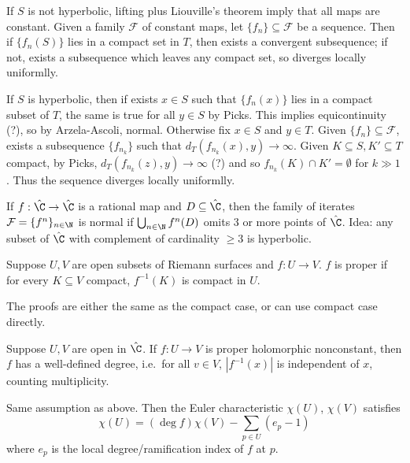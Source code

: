 \documentclass[a4paper]{article}
\begin{document}
\begin{remark}
  If \(S\) is not hyperbolic, lifting plus Liouville's theorem imply that all maps are constant. Given a family \(\mathcal F\) of constant maps, let \(\{f_n\} \subseteq \mathcal F\) be a sequence. Then if \(\{f_n(S)\}\) lies in a compact set in \(T\), then exists a convergent subsequence; if not, exists a subsequence which leaves any compact set, so diverges locally uniformlly.

  If \(S\) is hyperbolic, then if exists \(x \in S\) such that \(\{f_n(x)\}\) lies in a compact subset of \(T\), the same is true for all \(y \in S\) by Picks. This implies equicontinuity (?), so by Arzela-Ascoli, normal. Otherwise fix \(x \in S\) and \(y \in T\). Given \(\{f_n\} \subseteq \mathcal F\), exists a subsequence \(\{f_{n_k}\}\) such that \(d_T(f_{n_k}(x), y) \to \infty\). Given \(K \subseteq S, K' \subseteq T\) compact, by Picks, \(d_T(f_{n_k}(z), y) \to \infty\) (?) and so \(f_{n_k}(K) \cap K' = \emptyset\) for \(k \gg 1\). Thus the sequence diverges locally uniformlly.
\end{remark}

\begin{eg}
  If \(f: \hat \C \to \hat \C\) is a rational map and \(D \subseteq \hat \C\), then the family of iterates \(\mathcal F = \{f^n\}_{n \in \N}\) is normal if \(\bigcup_{n \in \N} f^n(D)\) omits 3 or more points of \(\hat \C\). Idea: any subset of \(\hat \C\) with complement of cardinality \(\geq 3\) is hyperbolic.
\end{eg}

\begin{definition}
  Suppose \(U, V\) are open subsets of Riemann surfaces and \(f: U \to V\). \(f\) is proper if for every \(K \subseteq V\) compact, \(f^{-1}(K)\) is compact in \(U\).
\end{definition}

The proofs are either the same as the compact case, or can use compact case directly.

\begin{proposition}
  Suppose \(U, V\) are open in \(\hat \C\). If \(f: U \to V\) is proper holomorphic nonconstant, then \(f\) has a well-defined degree, i.e.\ for all \(v \in V\), \(|f^{-1}(x)|\) is independent of \(x\), counting multiplicity.
\end{proposition}

\begin{theorem}
  Same assumption as above. Then the Euler characteristic \(\chi(U)\), \(\chi(V)\) satisfies
  \[
    \chi(U) = (\deg f) \chi(V) - \sum_{p \in U}(e_p - 1)
  \]
  where \(e_p\) is the local degree/ramification index of \(f\) at \(p\).
\end{theorem}
\end{document}
